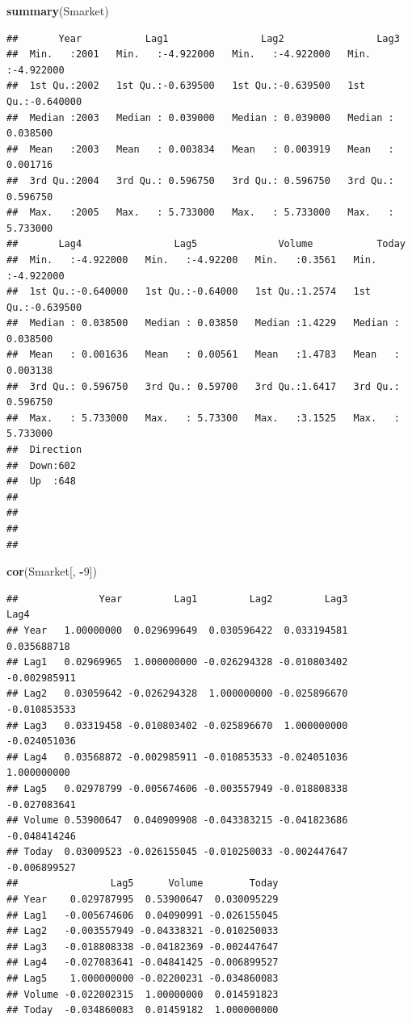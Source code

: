 \documentclass[
  11pt,
]{article}
\newenvironment{Shaded}{\begin{snugshade}}{\end{snugshade}}
\newcommand{\DecValTok}[1]{\textcolor[rgb]{0.00,0.00,0.81}{#1}}
\newcommand{\FunctionTok}[1]{\textcolor[rgb]{0.13,0.29,0.53}{\textbf{#1}}}
\newcommand{\NormalTok}[1]{#1}
\newcommand{\SpecialCharTok}[1]{\textcolor[rgb]{0.81,0.36,0.00}{\textbf{#1}}}
\begin{document}
\begin{Shaded}
\begin{Highlighting}[]
\FunctionTok{summary}\NormalTok{(Smarket)}
\end{Highlighting}
\end{Shaded}

\begin{verbatim}
##       Year           Lag1                Lag2                Lag3          
##  Min.   :2001   Min.   :-4.922000   Min.   :-4.922000   Min.   :-4.922000  
##  1st Qu.:2002   1st Qu.:-0.639500   1st Qu.:-0.639500   1st Qu.:-0.640000  
##  Median :2003   Median : 0.039000   Median : 0.039000   Median : 0.038500  
##  Mean   :2003   Mean   : 0.003834   Mean   : 0.003919   Mean   : 0.001716  
##  3rd Qu.:2004   3rd Qu.: 0.596750   3rd Qu.: 0.596750   3rd Qu.: 0.596750  
##  Max.   :2005   Max.   : 5.733000   Max.   : 5.733000   Max.   : 5.733000  
##       Lag4                Lag5              Volume           Today          
##  Min.   :-4.922000   Min.   :-4.92200   Min.   :0.3561   Min.   :-4.922000  
##  1st Qu.:-0.640000   1st Qu.:-0.64000   1st Qu.:1.2574   1st Qu.:-0.639500  
##  Median : 0.038500   Median : 0.03850   Median :1.4229   Median : 0.038500  
##  Mean   : 0.001636   Mean   : 0.00561   Mean   :1.4783   Mean   : 0.003138  
##  3rd Qu.: 0.596750   3rd Qu.: 0.59700   3rd Qu.:1.6417   3rd Qu.: 0.596750  
##  Max.   : 5.733000   Max.   : 5.73300   Max.   :3.1525   Max.   : 5.733000  
##  Direction 
##  Down:602  
##  Up  :648  
##            
##            
##            
## 
\end{verbatim}

\begin{Shaded}
\begin{Highlighting}[]
\FunctionTok{cor}\NormalTok{(Smarket[, }\SpecialCharTok{{-}}\DecValTok{9}\NormalTok{])}
\end{Highlighting}
\end{Shaded}

\begin{verbatim}
##              Year         Lag1         Lag2         Lag3         Lag4
## Year   1.00000000  0.029699649  0.030596422  0.033194581  0.035688718
## Lag1   0.02969965  1.000000000 -0.026294328 -0.010803402 -0.002985911
## Lag2   0.03059642 -0.026294328  1.000000000 -0.025896670 -0.010853533
## Lag3   0.03319458 -0.010803402 -0.025896670  1.000000000 -0.024051036
## Lag4   0.03568872 -0.002985911 -0.010853533 -0.024051036  1.000000000
## Lag5   0.02978799 -0.005674606 -0.003557949 -0.018808338 -0.027083641
## Volume 0.53900647  0.040909908 -0.043383215 -0.041823686 -0.048414246
## Today  0.03009523 -0.026155045 -0.010250033 -0.002447647 -0.006899527
##                Lag5      Volume        Today
## Year    0.029787995  0.53900647  0.030095229
## Lag1   -0.005674606  0.04090991 -0.026155045
## Lag2   -0.003557949 -0.04338321 -0.010250033
## Lag3   -0.018808338 -0.04182369 -0.002447647
## Lag4   -0.027083641 -0.04841425 -0.006899527
## Lag5    1.000000000 -0.02200231 -0.034860083
## Volume -0.022002315  1.00000000  0.014591823
## Today  -0.034860083  0.01459182  1.000000000
\end{verbatim}
\end{document}
